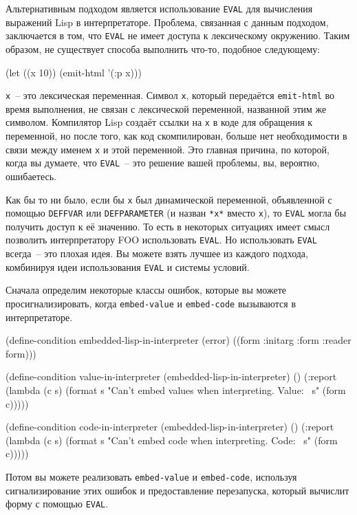 \small
Альтернативным подходом является использование \lstinline{EVAL} для вычисления
  выражений Lisp в интерпретаторе. Проблема, связанная с данным подходом, заключается в
  том, что \lstinline{EVAL} не имеет доступа к лексическому окружению. Таким образом, не
  существует способа выполнить что-то, подобное следующему:

\begin{myverb}
(let ((x 10)) (emit-html '(:p x)))
\end{myverb}

\noindent{}\lstinline!х!~-- это лексическая переменная. Символ \lstinline!х!, который передаётся
\lstinline!emit-html! во время выполнения, не связан с лексической переменной, названной
этим же символом.  Компилятор Lisp создаёт ссылки на \lstinline!х! в коде для обращения к
переменной, но после того, как код скомпилирован, больше нет необходимости в связи между
именем \lstinline!х! и этой переменной. Это главная причина, по которой, когда вы думаете,
что \lstinline!EVAL!~-- это решение вашей проблемы, вы, вероятно, ошибаетесь.

Как бы то ни было, если бы \lstinline{х} был динамической переменной, объявленной с по\-мощью
\lstinline{DEFFVAR} или \lstinline{DEFPARAMETER} (и назван \lstinline{*х*} вместо \lstinline{х}), то
\lstinline{EVAL} могла бы получить доступ к её значению.  То есть в некоторых ситуациях имеет
смысл позволить интерпретатору FOO использовать \lstinline{EVAL}. Но использовать \lstinline{EVAL}
всегда~-- это плохая идея. Вы можете взять лучшее из каждого подхода, комбинируя идеи
использования \lstinline{EVAL} и системы условий.

Сначала определим некоторые классы ошибок, которые вы можете просигнализировать,
когда \lstinline{embed-value} и \lstinline{embed-code} вызываются в интерпретаторе.

\begin{myverb}
(define-condition embedded-lisp-in-interpreter (error)
  ((form :initarg :form :reader form)))

(define-condition value-in-interpreter (embedded-lisp-in-interpreter) ()
  (:report
   (lambda (c s) 
     (format s "Can't embed values when interpreting. Value: ~s" (form c)))))

(define-condition code-in-interpreter (embedded-lisp-in-interpreter) ()
  (:report
   (lambda (c s) 
     (format s "Can't embed code when interpreting. Code: ~s" (form c)))))
\end{myverb}

Потом вы можете реализовать \lstinline{embed-value} и \lstinline{embed-code}, используя
сигнализирование этих ошибок и предоставление перезапуска, который вычислит форму с
помощью \lstinline{EVAL}.


